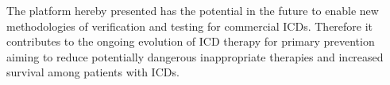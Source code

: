 \documentclass[a4paper, 10pt, conference]{ieeeconf}      %
\begin{document}
The platform hereby presented has the potential in the future to enable new methodologies of verification and testing for commercial ICDs.  
Therefore it contributes to the ongoing evolution of ICD therapy for primary prevention aiming to reduce potentially dangerous inappropriate therapies and increased survival among patients with ICDs.


	
	
\end{document}
